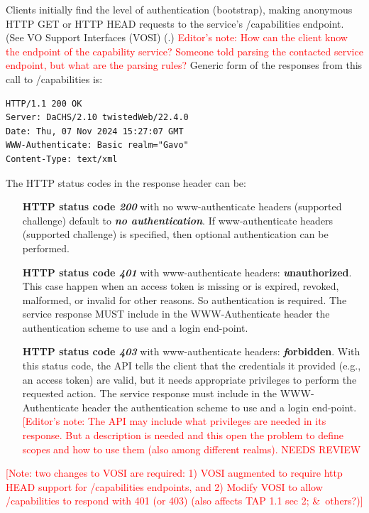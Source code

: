 \documentclass[11pt,a4paper]{ivoa}
\begin{document}
Clients initially find the level of authentication
(bootstrap), making anonymous HTTP GET or HTTP HEAD requests to
the service's /capabilities endpoint. (See VO Support Interfaces (VOSI)
(\citep{2017ivoa.spec.0524G}.)
\textcolor{red}{Editor's note: How can the client know the
endpoint of the capability service? Someone told parsing the
contacted service endpoint, but what are the parsing rules?}
Generic form of the responses from this call to /capabilities is:
\begin{verbatim}
HTTP/1.1 200 OK
Server: DaCHS/2.10 twistedWeb/22.4.0
Date: Thu, 07 Nov 2024 15:27:07 GMT
WWW-Authenticate: Basic realm="Gavo"
Content-Type: text/xml
\end{verbatim}
The HTTP status codes in the response header can be:
\begin{itemize}
\item [{\bf HTTP status code {\emph{200}}}] with no www-authenticate headers (supported challenge) 
default to {\bf{\emph{no authentication}}}. If www-authenticate headers (supported challenge) 
is specified, then optional authentication can be performed.
\item [{\bf HTTP status code {\emph{401}}}] with 
www-authenticate headers: {\bf{\emph unauthorized}}. This case happen
when an access token is missing or is expired, revoked, malformed,
or invalid for other reasons. So authentication is required.
The service response MUST include in the WWW-Authenticate header the authentication scheme to use and a login end-point.
\item [{\bf HTTP status code {\emph{403}}}] with www-authenticate
headers: {\bf{\emph forbidden}}. 
With this status code, the API tells the client that the credentials it 
provided (e.g., an access token) are valid, but it needs 
appropriate privileges to perform the requested action.
The service response must include in the WWW-Authenticate header the authentication 
scheme to use and a login end-point.
\textcolor{red}{[Editor's note: The API 
may include what privileges are needed in its response. But
a description is needed and this open the problem to define 
scopes and how to use them (also among different realms).
NEEDS REVIEW}
\end{itemize}

\textcolor{red}{[Note: two changes to VOSI are required: 1) VOSI augmented to
require http HEAD support for /capabilities endpoints, and 2) Modify
VOSI to allow /capabilities to respond with 401 (or 403) (also affects
TAP 1.1 sec 2; \&\ others?)]}
\end{document}
